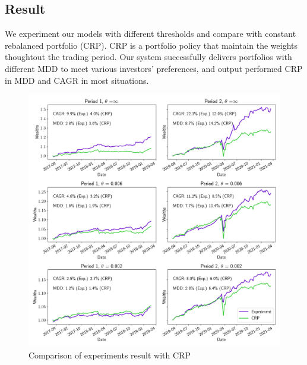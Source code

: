 \subsection{Result}
We experiment our models with different thresholds and compare with constant rebalanced portfolio (CRP). 
CRP is a portfolio policy that maintain the weights thoughtout the trading period. 
Our system successfully delivers portfolios with different MDD to meet various investors' preferences, and output performed CRP in MDD and CAGR in most situations.

\begin{figure}[htb]
\centering
  \includegraphics[width=16cm]{images/crp_compare.png}
  \caption [Comparison of experiments result with CRP]{Comparison of experiments result with CRP}
  \label{fig:crp_compare}
\end{figure}